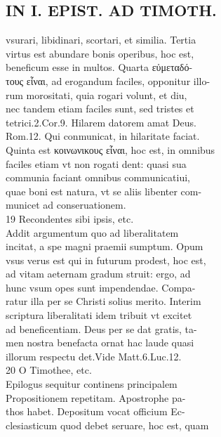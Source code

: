 \documentclass{article}
\begin{document}
\begin{pages}
\section*{IN I. EPIST. AD TIMOTH. \\
                }
vsurari, libidinari, scortari, et similia. Tertia \\
                virtus est abundare bonis operibus, hoc est, \\
                beneficum esse in multos. Quarta εὐμεταδό- \\
                τους εἶναι, ad erogandum faciles, opponitur illo- \\
                rum morositati, quia rogari volunt, et diu, \\
                nec tandem etiam faciles sunt, sed tristes et \\
                tetrici.2.Cor.9. Hilarem datorem amat Deus. \\
                Rom.12. Qui conmunicat, in hilaritate faciat. \\
                Quinta est κοινωνικους εἶναι, hoc est, in omnibus \\
                faciles etiam vt non rogati dent: quasi sua \\
                communia faciant omnibus communicatiui, \\
                quae boni est natura, vt se aliis libenter com- \\
                municet ad conseruationem. \\
                19 Recondentes sibi ipsis, etc. \\
                Addit argumentum quo ad liberalitatem \\
                incitat, a spe magni praemii sumptum. Opum \\
                vsus verus est qui in futurum prodest, hoc est, \\
                ad vitam aeternam gradum struit: ergo, ad \\
                hunc vsum opes sunt impendendae. Compa- \\
                ratur illa per se Christi solius merito. Interim \\
                scriptura liberalitati idem tribuit vt excitet \\
                ad beneficentiam. Deus per se dat gratis, ta- \\
                men nostra benefacta ornat hac laude quasi \\
                illorum respectu det.Vide Matt.6.Luc.12. \\
                20 O Timothee, etc. \\
                Epilogus sequitur continens principalem \\
                Propositionem repetitam. Apostrophe pa- \\
                thos habet. Depositum vocat officium Ec- \\
                clesiasticum quod debet seruare, hoc est, quam \\
                

\end{pages}
\end{document}

